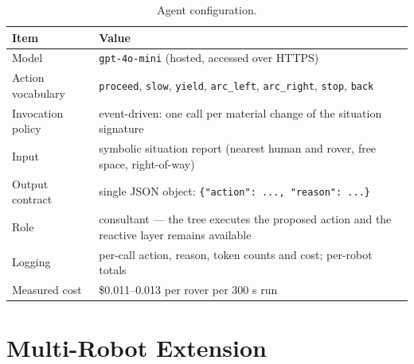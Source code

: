 \begin{table}[htbp]
  \centering
  \small
  \caption{Agent configuration.}
  \label{tab:llm}
  \begin{tabular}{ll}
    \toprule
    Item & Value \\
    \midrule
    Model & \texttt{gpt-4o-mini} (hosted, accessed over HTTPS) \\
    Action vocabulary & \texttt{proceed}, \texttt{slow}, \texttt{yield}, \texttt{arc\_left}, \texttt{arc\_right}, \texttt{stop}, \texttt{back} \\
    Invocation policy & event-driven: one call per material change of the situation signature \\
    Input & symbolic situation report (nearest human and rover, free space, right-of-way) \\
    Output contract & single JSON object: \texttt{\{"action": ..., "reason": ...\}} \\
    Role & consultant — the tree executes the proposed action and the reactive layer remains available \\
    Logging & per-call action, reason, token counts and cost; per-robot totals \\
    Measured cost & \$0.011--0.013 per rover per 300 s run \\
    \bottomrule
  \end{tabular}
\end{table}


\section{Multi-Robot Extension}
\label{sec:sd_multi_robot}


